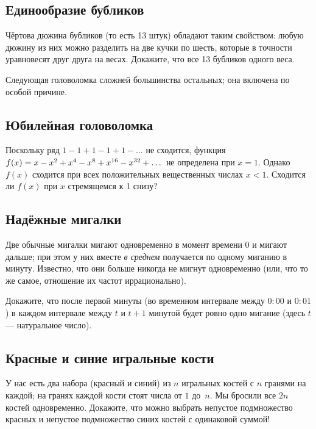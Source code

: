 \subsection*{Единообразие бубликов}\label{Единообразие бубликов}

Чёртова дюжина бубликов (то есть 13 штук) обладают таким свойством: любую дюжину из них можно разделить на две кучки по шесть, которые в точности уравновесят друг друга на весах.
Докажите, что все 13 бубликов одного веса.

\medskip

Следующая головоломка сложней большинства остальных;
она включена по особой причине.

\subsection*{Юбилейная головоломка}

Поскольку ряд $1 - 1 + 1 - 1 + 1 - \dots$ не сходится,  функция 
$f(x)\z=x-x^2+x^4-x^8+x^{16}-x^{32}+\dots$ не определена при $x=1$.
Однако $f(x)$ сходится при всех положительных вещественных числах $x<1$.
Сходится ли $f(x)$ при $x$ стремящемся к 1 снизу?

\subsection*{Надёжные мигалки}\label{Надёжные мигалки}

Две обычные мигалки мигают одновременно в момент времени $0$
и мигают дальше; при этом у них вместе \emph{в среднем} получается по одному миганию в минуту.
Известно, что они больше никогда не мигнут одновременно (или, что то же самое, отношение их частот иррационально).

Докажите, что после первой минуты (во временном интервале между $0{:}00$ и $0{:}01$) в каждом интервале между $t$ и $t + 1$ минутой будет ровно одно мигание (здесь $t$ --- натуральное число).

\subsection*{Красные и синие игральные кости}\label{Красные и синие игральные кости}

У нас есть два набора (красный и синий) из $n$ игральных костей с $n$ гранями на каждой;
на гранях каждой кости стоят числа от $1$ до~$n$.
Мы бросили все $2n$ костей одновременно.
Докажите, что можно выбрать непустое подмножество красных и непустое подмножество синих костей с одинаковой суммой!

